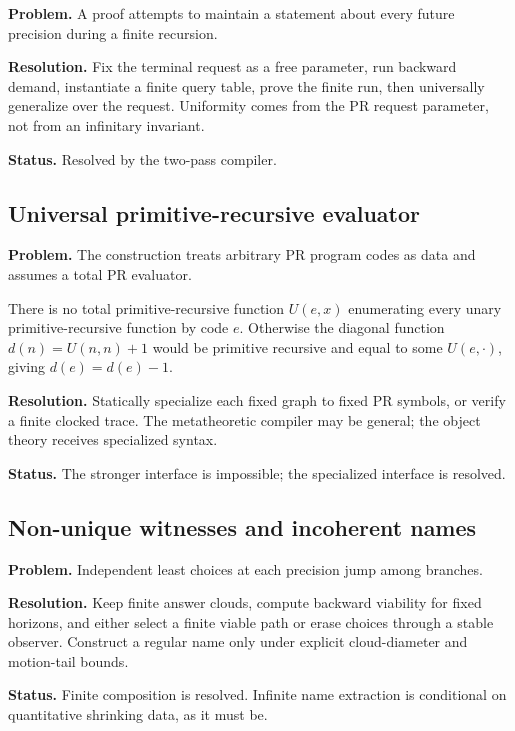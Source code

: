 \textbf{Problem.} A proof attempts to maintain a statement about every future precision during a finite recursion.

\textbf{Resolution.} Fix the terminal request as a free parameter, run backward demand, instantiate a finite query table, prove the finite run, then universally generalize over the request.  Uniformity comes from the PR request parameter, not from an infinitary invariant.

\textbf{Status.} Resolved by the two-pass compiler.

\subsection{Universal primitive-recursive evaluator}

\textbf{Problem.} The construction treats arbitrary PR program codes as data and assumes a total PR evaluator.

\begin{barrier}
There is no total primitive-recursive function \(U(e,x)\) enumerating every unary primitive-recursive function by code \(e\).  Otherwise the diagonal function \(d(n)=U(n,n)+1\) would be primitive recursive and equal to some \(U(e,\cdot)\), giving \(d(e)=d(e)-1\).
\end{barrier}

\textbf{Resolution.} Statically specialize each fixed graph to fixed PR symbols, or verify a finite clocked trace.  The metatheoretic compiler may be general; the object theory receives specialized syntax.

\textbf{Status.} The stronger interface is impossible; the specialized interface is resolved.

\subsection{Non-unique witnesses and incoherent names}

\textbf{Problem.} Independent least choices at each precision jump among branches.

\textbf{Resolution.} Keep finite answer clouds, compute backward viability for fixed horizons, and either select a finite viable path or erase choices through a stable observer.  Construct a regular name only under explicit cloud-diameter and motion-tail bounds.

\textbf{Status.} Finite composition is resolved.  Infinite name extraction is conditional on quantitative shrinking data, as it must be.

